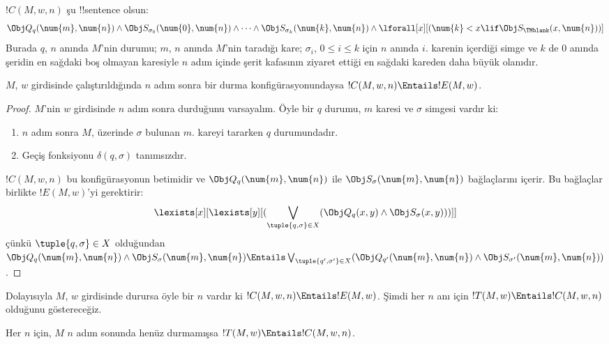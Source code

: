 \begin{defn} 
$!C(M,w,n)$ şu !!{sentence} olsun:
\[ 
\Obj Q_q(\num{m}, \num{n}) \land \Obj S_{\sigma_0}(\num{0}, \num{n})
\land \dots \land \Obj S_{\sigma_k}(\num{k}, \num{n}) \land
\lforall[x][(\num{k} < x \lif \Obj S_\TMblank(x, \num{n}))]
\] 
Burada $q$, $n$ anında $M$'nin durumu; $m$, $n$ anında $M$'nin taradığı
kare; $\sigma_i$, $0\le i\le k$ için $n$ anında $i$. karenin içerdiği simge
ve $k$ de $0$ anında şeridin en sağdaki boş olmayan karesiyle $n$ adım içinde
şerit kafasının ziyaret ettiği en sağdaki kareden daha büyük olanıdır.
\end{defn}

\begin{lem}
$M$, $w$ girdisinde çalıştırıldığında $n$ adım sonra bir durma
konfigürasyonundaysa $!C(M,w,n)\Entails !E(M,w)$.
\end{lem}

\begin{proof}
$M$'nin $w$ girdisinde $n$ adım sonra durduğunu varsayalım. Öyle bir $q$
durumu, $m$ karesi ve $\sigma$ simgesi vardır ki:
\begin{enumerate} 
\item $n$ adım sonra $M$, üzerinde $\sigma$ bulunan $m$. kareyi tararken
  $q$ durumundadır.
\item Geçiş fonksiyonu $\delta(q,\sigma)$ tanımsızdır.
\end{enumerate}
$!C(M,w,n)$ bu konfigürasyonun betimidir ve
$\Obj Q_q(\num{m},\num{n})$ ile
$\Obj S_\sigma(\num{m},\num{n})$ bağlaçlarını içerir. Bu bağlaçlar birlikte
$!E(M,w)$'yi gerektirir:
\[
\lexists[x][\lexists[y][(\bigvee_{\tuple{q, \sigma} \in
      X}(\Obj Q_q(x, y) \land \Obj S_\sigma(x, y)))]]
\]
çünkü $\tuple{q,\sigma}\in X$ olduğundan
$\Obj Q_q(\num{m},\num{n})\land\Obj S_\sigma(\num{m},\num{n})
\Entails \bigvee_{\tuple{q',\sigma'}\in X}
(\Obj Q_{q'}(\num{m},\num{n})\land
\Obj S_{\sigma'}(\num{m},\num{n}))$.
\end{proof}

\begin{explain}
Dolayısıyla $M$, $w$ girdisinde durursa öyle bir $n$ vardır ki
$!C(M,w,n)\Entails !E(M,w)$. Şimdi her $n$ anı için
$!T(M,w)\Entails !C(M,w,n)$ olduğunu göstereceğiz.
\end{explain}

\begin{lem}
Her $n$ için, $M$ $n$ adım sonunda henüz durmamışsa
$!T(M,w)\Entails !C(M,w,n)$.
\end{lem}

